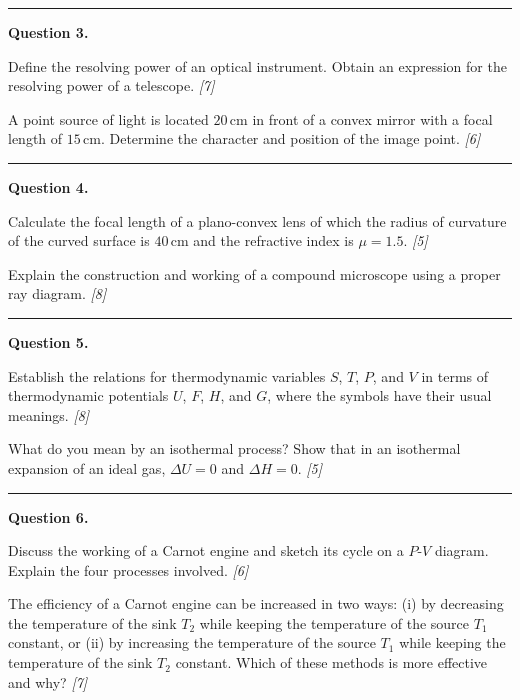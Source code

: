 \documentclass[11pt,a4paper]{article}
\newcommand{\pts}[1]{\hfill   \textit{[#1]}}
\begin{document}
\medskip\rule{\linewidth}{0.2pt}




\noindent   \textbf{Question 3.}

\begin{parts}
  \item Define the resolving power of an optical instrument. Obtain an expression for the resolving power of a telescope. \pts{7}
  \item A point source of light is located $20\, \text{cm}$ in front of a convex mirror with a focal length of $15\, \text{cm}$. Determine the character and position of the image point. \pts{6}
\end{parts}

\medskip\rule{\linewidth}{0.2pt}




\noindent   \textbf{Question 4.}

\begin{parts}
  \item Calculate the focal length of a plano-convex lens of which the radius of curvature of the curved surface is $40\, \text{cm}$ and the refractive index is $\mu = 1.5$. \pts{5}
  \item Explain the construction and working of a compound microscope using a proper ray diagram. \pts{8}
\end{parts}

\medskip\rule{\linewidth}{0.2pt}




\noindent   \textbf{Question 5.}

\begin{parts}
  \item Establish the relations for thermodynamic variables $S$, $T$, $P$, and $V$ in terms of thermodynamic potentials $U$, $F$, $H$, and $G$, where the symbols have their usual meanings. \pts{8}
  \item What do you mean by an isothermal process? Show that in an isothermal expansion of an ideal gas, $\Delta U = 0$ and $\Delta H = 0$. \pts{5}
\end{parts}

\medskip\rule{\linewidth}{0.2pt}




\noindent   \textbf{Question 6.}

\begin{parts}
  \item Discuss the working of a Carnot engine and sketch its cycle on a $P$-$V$ diagram. Explain the four processes involved. \pts{6}
  \item The efficiency of a Carnot engine can be increased in two ways: (i) by decreasing the temperature of the sink $T_2$ while keeping the temperature of the source $T_1$ constant, or (ii) by increasing the temperature of the source $T_1$ while keeping the temperature of the sink $T_2$ constant. Which of these methods is more effective and why? \pts{7}
\end{parts}
\end{document}
